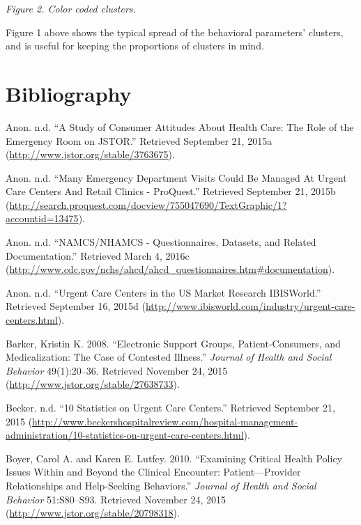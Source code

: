 \documentclass[12pt,twoside]{reedthesis}
\begin{document}
  \emph{Figure 2. Color coded clusters.}
  
  Figure 1 above shows the typical spread of the behavioral parameters'
  clusters, and is useful for keeping the proportions of clusters in mind.
  
  \backmatter
  
  \chapter*{Bibliography}\label{bibliography}
  
  \noindent
  \setlength{\parindent}{-0.20in} \setlength{\leftskip}{0.20in}
  \setlength{\parskip}{8pt}
  
  \hypertarget{refs}{}
  \hypertarget{ref-CONSUMERux5fHEALTH}{}
  Anon. n.d. ``A Study of Consumer Attitudes About Health Care: The Role
  of the Emergency Room on JSTOR.'' Retrieved September 21, 2015a
  (\url{http://www.jstor.org/stable/3763675}).
  
  \hypertarget{ref-manyux5fER}{}
  Anon. n.d. ``Many Emergency Department Visits Could Be Managed At Urgent
  Care Centers And Retail Clinics - ProQuest.'' Retrieved September 21,
  2015b
  (\url{http://search.proquest.com/docview/755047690/TextGraphic/1?accountid=13475}).
  
  \hypertarget{ref-namcs}{}
  Anon. n.d. ``NAMCS/NHAMCS - Questionnaires, Datasets, and Related
  Documentation.'' Retrieved March 4, 2016c
  (\url{http://www.cdc.gov/nchs/ahcd/ahcd_questionnaires.htm\#documentation}).
  
  \hypertarget{ref-UCux5fMarket}{}
  Anon. n.d. ``Urgent Care Centers in the US Market Research IBISWorld.''
  Retrieved September 16, 2015d
  (\url{http://www.ibisworld.com/industry/urgent-care-centers.html}).
  
  \hypertarget{ref-barkerux5felectronicux5f2008}{}
  Barker, Kristin K. 2008. ``Electronic Support Groups, Patient-Consumers,
  and Medicalization: The Case of Contested Illness.'' \emph{Journal of
  Health and Social Behavior} 49(1):20--36. Retrieved November 24, 2015
  (\url{http://www.jstor.org/stable/27638733}).
  
  \hypertarget{ref-UCux5f10STATS}{}
  Becker. n.d. ``10 Statistics on Urgent Care Centers.'' Retrieved
  September 21, 2015
  (\url{http://www.beckershospitalreview.com/hospital-management-administration/10-statistics-on-urgent-care-centers.html}).
  
  \hypertarget{ref-boyerux5fexaminingux5f2010}{}
  Boyer, Carol A. and Karen E. Lutfey. 2010. ``Examining Critical Health
  Policy Issues Within and Beyond the Clinical Encounter:
  Patient---Provider Relationships and Help-Seeking Behaviors.''
  \emph{Journal of Health and Social Behavior} 51:S80--S93. Retrieved
  November 24, 2015 (\url{http://www.jstor.org/stable/20798318}).
  
\end{document}
